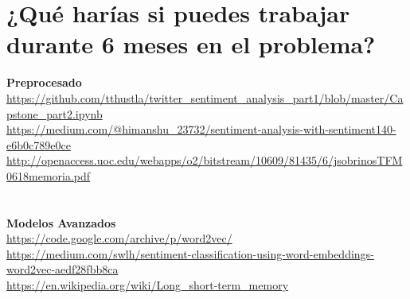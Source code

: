 \documentclass[a4paper,12pt]{report}
\begin{document}
\clearpage

\section{¿Qué harías si puedes trabajar durante 6 meses en el problema?}















\begin{thebibliography}{X}

\textbf{Preprocesado}
\vspace{2mm}
\\\url{https://github.com/tthustla/twitter_sentiment_analysis_part1/blob/master/Capstone_part2.ipynb}
\vspace{2mm}
\\\url{https://medium.com/@himanshu_23732/sentiment-analysis-with-sentiment140-e6b0c789e0ce}
\vspace{2mm}
\\\url{http://openaccess.uoc.edu/webapps/o2/bitstream/10609/81435/6/jsobrinosTFM0618memoria.pdf}
\vspace{2mm}
\\\url{}
\vspace{2mm}\\
\\\textbf{Modelos Avanzados}
\vspace{2mm}
\\\url{https://code.google.com/archive/p/word2vec/}
\vspace{2mm}
\\\url{https://medium.com/swlh/sentiment-classification-using-word-embeddings-word2vec-aedf28fbb8ca}
\vspace{2mm}
\\\url{https://en.wikipedia.org/wiki/Long_short-term_memory}
\vspace{2mm}

\end{thebibliography}
\end{document}
